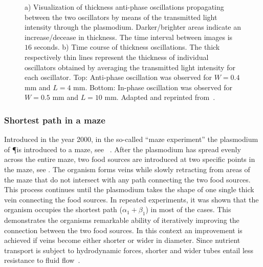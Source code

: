 			\begin{figure}
				\centering
				\newline
	
				\caption[Oscillator experiment - Thickness oscillations]{a) Visualization of thickness anti-phase oscillations propagating between the two oscillators by means of the transmitted light intensity through the plasmodium. Darker/brighter areas indicate an increase/decease in thickness. The time interval between images is $16$ seconds. b) Time course of thickness oscillations. The thick respectively thin lines represent the thickness of individual oscillators obtained by averaging the transmitted light intensity for each oscillator.
				Top: Anti-phase oscillation was observed for $W=0.4$ mm and $L=4$ mm. Bottom: In-phase oscillation was observed for $W=0.5$ mm and $L=10$ mm. Adapted and reprinted from~\cite{PhysRevLett.85.2026}.}
				\label{fig:oscillator_experiment_thickness}
			\end{figure}{}

		\subsubsection{Shortest path in a maze}

			Introduced in the year 2000, in the so-called ``maze experiment'' the plasmodium of \P is introduced to a maze, see ~\cite{nakagaki2000intelligence}. After the plasmodium has spread evenly across the entire maze, two food sources are introduced at two specific points in the maze, see . The organism forms veins while slowly retracting from areas of the maze that do not intersect with any path connecting the two food sources. This process continues until the plasmodium takes the shape of one single thick vein connecting the food sources. In repeated experiments, it was shown that the organism occupies the shortest path ($\alpha_1 + \beta_1$) in most of the cases. This demonstrates the organisms remarkable ability of iteratively improving the connection between the two food sources. In this context an improvement is achieved if veins become either shorter or wider in diameter. Since nutrient transport is subject to hydrodynamic forces, shorter and wider tubes entail less resistance to fluid flow~\cite{kamiya1959motive}.

